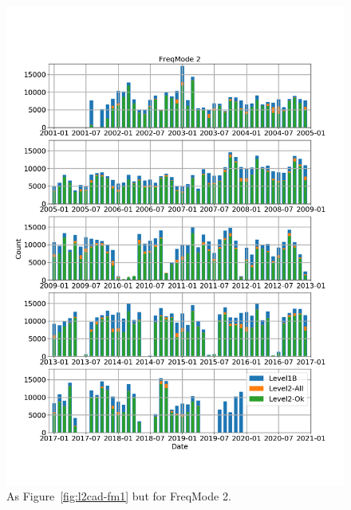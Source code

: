 \begin{figure}[t]
\centering
\includegraphics[width=1.0\textwidth]{l2cad-fm2.png}
\caption{As Figure~\ref{fig:l2cad-fm1} but for FreqMode 2.}
\label{fig:l2cad-fm2}
\end{figure}

